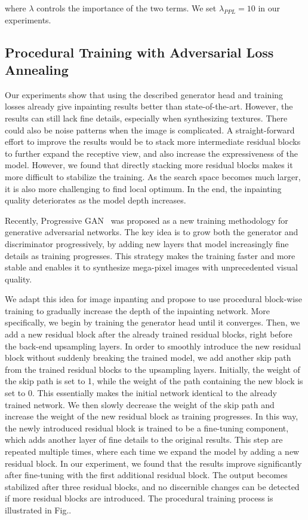 where $\lambda$ controls the importance of the two terms. We set $\lambda_{PPL}=10$ in our experiments.

\subsection{Procedural Training with Adversarial Loss Annealing}
\label{sec:procedural}
Our experiments show that using the described generator head and training losses already give inpainting results better than state-of-the-art. However, the results can still lack fine details, especially when synthesizing textures. There could also be noise patterns when the image is complicated. A straight-forward effort to improve the results would be to stack more intermediate residual blocks to further expand the receptive view, and also increase the expressiveness of the model. However, we found that directly stacking more residual blocks makes it more difficult to stabilize the training. As the search space becomes much larger, it is also more challenging to find local optimum. In the end, the inpainting quality deteriorates as the model depth increases.

Recently, Progressive GAN~\cite{karras2017progressive} was proposed as a new training methodology for generative adversarial networks. The key idea is to grow both the generator and discriminator progressively, by adding new layers that model increasingly fine details as training progresses. This strategy makes the training faster and more stable and enables it to synthesize mega-pixel images with unprecedented visual quality.  

We adapt this idea for image inpanting and propose to use procedural block-wise training to gradually increase the depth of the inpainting network. More specifically, we begin by training the generator head until it converges. Then, we add a new residual block after the already trained residual blocks, right before the back-end upsampling layers. In order to smoothly introduce the new residual block without suddenly breaking the trained model, we add another skip path from the trained residual blocks to the upsampling layers. Initially, the weight of the skip path is set to 1, while the weight of the path containing the new block is set to 0. This essentially makes the initial network identical to the already trained network. We then slowly decrease the weight of the skip path and increase the weight of the new residual block as training progresses. In this way, the newly introduced residual block is trained to be a fine-tuning component, which adds another layer of fine details to the original results. This step are repeated multiple times, where each time we expand the model by adding a new residual block. In our experiment, we found that the results improve significantly after fine-tuning with the first additional residual block. The output becomes stabilized after three residual blocks, and no discernible changes can be detected if more residual blocks are introduced. The procedural training process is illustrated in Fig..

